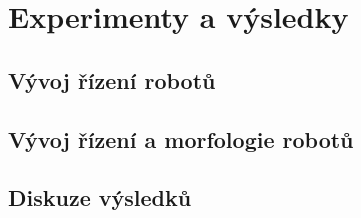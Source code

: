 
\chapter{Experimenty a výsledky}

\section{Vývoj řízení robotů}

\section{Vývoj řízení a morfologie robotů}

\section{Diskuze výsledků}
